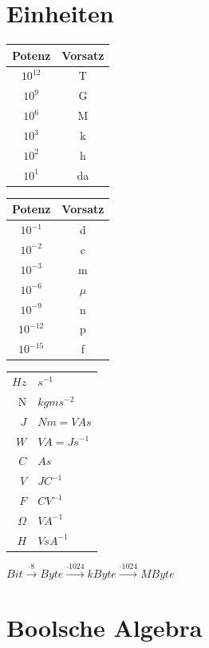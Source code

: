 \documentclass[6pt,a4paper]{scrartcl}
\begin{document}
\begin{multicols*}{3}
\section{Einheiten}
\begin{multicols}{3}
\begin{tabular}{c | c}
	Potenz & Vorsatz \\ \midrule
	$10^{12}$ & T \\
	$10^{9}$ & G \\
	$10^{6}$ & M \\
	$10^{3}$ & k \\
	$10^{2}$ & h \\
	$10^{1}$ & da 
\end{tabular}
\begin{tabular}{c | c}
	Potenz & Vorsatz \\ \midrule
	$10^{-1}$ & d \\
	$10^{-2}$ & c \\
	$10^{-3}$ & m \\
	$10^{-6}$ & $\mu$	\\
	$10^{-9}$ & n \\
	$10^{-12}$ & p \\
	$10^{-15}$ & f
\end{tabular}
\begin{tabular}{ r | l }
$Hz$ & $s^{-1}$ \\
N & $kg m s^{-2} $ \\
$J $ & $ N m = V A s$\\
$W $ & $ V A  = J s^{-1} $ \\
$ C $ & $ A s $ \\
$V $ & $ J C^{-1} $\\
$F $ & $ C V^{-1} $ \\
$\Omega $ & $ V A^{-1} $\\
$ H $ & $ V s  A^{-1}$
\end{tabular}
\end{multicols}
$Bit \xrightarrow{\cdot 8} Byte \xrightarrow{\cdot 1024} kByte \xrightarrow{\cdot 1024} MByte$\\
	
\section{Boolsche Algebra}


\end{multicols*}
\end{document}
